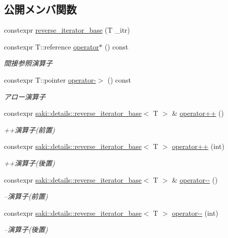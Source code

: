 \subsection*{公開メンバ関数}
\begin{DoxyCompactItemize}
\item 
constexpr \mbox{\hyperlink{classsaki_1_1details_1_1reverse__iterator__base_accf1bbae68adfab1bf6e88927e3bc453}{reverse\+\_\+iterator\+\_\+base}} (T \+\_\+itr)
\item 
constexpr T\+::reference \mbox{\hyperlink{classsaki_1_1details_1_1reverse__iterator__base_a7f5228433a205d730e987452ff6e8800}{operator$\ast$}} () const
\begin{DoxyCompactList}\small\item\em 間接参照演算子 \end{DoxyCompactList}\item 
constexpr T\+::pointer \mbox{\hyperlink{classsaki_1_1details_1_1reverse__iterator__base_a15f86c8e2c5830b9b3eaf92cee6fb578}{operator-\/$>$}} () const
\begin{DoxyCompactList}\small\item\em アロー演算子 \end{DoxyCompactList}\item 
constexpr \mbox{\hyperlink{classsaki_1_1details_1_1reverse__iterator__base}{saki\+::details\+::reverse\+\_\+iterator\+\_\+base}}$<$ T $>$ \& \mbox{\hyperlink{classsaki_1_1details_1_1reverse__iterator__base_a6e8e3c069dea1df9a848c95ffe60acbb}{operator++}} ()
\begin{DoxyCompactList}\small\item\em ++演算子(前置) \end{DoxyCompactList}\item 
constexpr \mbox{\hyperlink{classsaki_1_1details_1_1reverse__iterator__base}{saki\+::details\+::reverse\+\_\+iterator\+\_\+base}}$<$ T $>$ \mbox{\hyperlink{classsaki_1_1details_1_1reverse__iterator__base_a7cd2bc5d74938f93c2b07e059068f830}{operator++}} (int)
\begin{DoxyCompactList}\small\item\em ++演算子(後置) \end{DoxyCompactList}\item 
constexpr \mbox{\hyperlink{classsaki_1_1details_1_1reverse__iterator__base}{saki\+::details\+::reverse\+\_\+iterator\+\_\+base}}$<$ T $>$ \& \mbox{\hyperlink{classsaki_1_1details_1_1reverse__iterator__base_aea4bcf44b41d1d5cdb37a630ed9a2e4e}{operator-\/-\/}} ()
\begin{DoxyCompactList}\small\item\em --演算子(前置) \end{DoxyCompactList}\item 
constexpr \mbox{\hyperlink{classsaki_1_1details_1_1reverse__iterator__base}{saki\+::details\+::reverse\+\_\+iterator\+\_\+base}}$<$ T $>$ \mbox{\hyperlink{classsaki_1_1details_1_1reverse__iterator__base_a244654b13c3e164f5382b1216fc5be1f}{operator-\/-\/}} (int)
\begin{DoxyCompactList}\small\item\em --演算子(後置) \end{DoxyCompactList}\end{DoxyCompactItemize}
